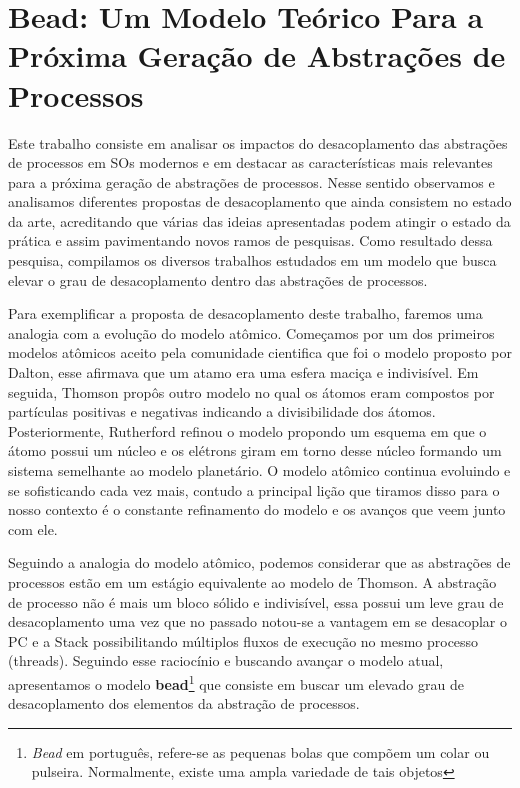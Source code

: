 \section{Bead: Um Modelo Teórico Para a Próxima Geração de Abstrações de Processos}

Este trabalho consiste em analisar os impactos do desacoplamento das abstrações
de processos em SOs modernos e em destacar as características mais relevantes
para a próxima geração de abstrações de processos. Nesse sentido observamos e
analisamos diferentes propostas de desacoplamento que ainda consistem no estado
da arte, acreditando que várias das ideias apresentadas podem atingir o estado
da prática e assim pavimentando novos ramos de pesquisas. Como resultado dessa
pesquisa, compilamos os diversos trabalhos estudados em um modelo que busca
elevar o grau de desacoplamento dentro das abstrações de processos.

Para exemplificar a proposta de desacoplamento deste trabalho, faremos uma
analogia com a evolução do modelo atômico. Começamos por um dos primeiros
modelos atômicos aceito pela comunidade cientifica que foi o modelo proposto
por Dalton, esse afirmava que um atamo era uma esfera maciça e indivisível. Em
seguida, Thomson propôs outro modelo no qual os átomos eram compostos por
partículas positivas e negativas indicando a divisibilidade dos átomos.
Posteriormente, Rutherford refinou o modelo propondo um esquema em que o átomo
possui um núcleo e os elétrons giram em torno desse núcleo formando um sistema
semelhante ao modelo planetário. O modelo atômico continua evoluindo e se
sofisticando cada vez mais, contudo a principal lição que tiramos disso para o
nosso contexto é o constante refinamento do modelo e os avanços que veem junto
com ele.

Seguindo a analogia do modelo atômico, podemos considerar que as abstrações de
processos estão em um estágio equivalente ao modelo de Thomson. A abstração de
processo não é mais um bloco sólido e indivisível, essa possui um leve grau de
desacoplamento uma vez que no passado notou-se a vantagem em se desacoplar o PC
e a Stack possibilitando múltiplos fluxos de execução no mesmo processo
(threads). Seguindo esse raciocínio e buscando avançar o modelo atual,
apresentamos o modelo \textbf{bead}\footnote{\emph{Bead} em português,
refere-se as pequenas bolas que compõem um colar ou pulseira. Normalmente,
existe uma ampla variedade de tais objetos} que consiste em buscar um elevado
grau de desacoplamento dos elementos da abstração de processos.

